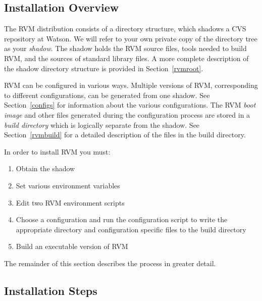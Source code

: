 \subsection{Installation Overview}
The RVM distribution consists of a directory structure, which shadows a
CVS repository at Watson. 
We will refer to your own private copy of the 
directory tree as your {\em shadow}.  The shadow holds the RVM 
source files, tools needed to build RVM, and the sources of standard
library files. 
A more complete description of the shadow directory structure
is provided in Section~\ref{rvmroot}.

RVM can be configured in various ways. Multiple versions of RVM,
corresponding to different configurations, can be generated from 
one shadow. See Section~\ref{configs} for information about the various 
configurations.
The RVM  {\em boot image} and other files generated during the 
configuration process
are stored in a {\em build directory} which is logically separate from 
the shadow. See Section~\ref{rvmbuild} for a detailed description of the
files in the build directory.

In order to install RVM  you must:
\begin{enumerate}
\item Obtain the shadow
\item Set various environment variables
\item Edit two RVM environment scripts
\item Choose a configuration and run the configuration script to write
the appropriate directory and configuration specific files to the
build directory
\item Build an executable version of RVM
\end{enumerate}

The remainder of this section describes the process in greater detail.

\subsection{Installation Steps}

